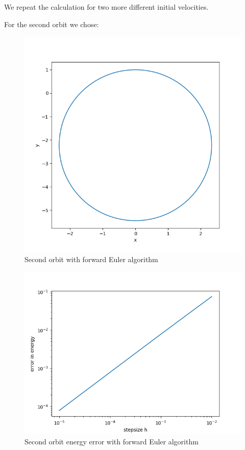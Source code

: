 \documentclass[11pt, a4paper, reqno]{scrartcl}
\begin{document}
    		
    		We repeat the calculation for two more different initial velocities.
    		
    		For the second orbit we chose:
    		\begin{figure}[H]
        		   
    		\end{figure}
    		
    		\begin{figure}[H]
    			\includegraphics[width=.5\paperwidth]{figure_2.png}
    			\caption{Second orbit with forward Euler algorithm}
    		\end{figure}
    		
    		\begin{figure}[H]
    			\includegraphics[width=.5\paperwidth]{figure_2_2.png}
    			\caption{Second orbit energy error with forward Euler algorithm}
    		\end{figure}
    		
\end{document}
